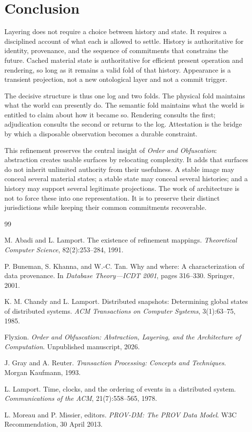 \documentclass[11pt]{article}
\begin{document}
\section{Conclusion}

Layering does not require a choice between history and state. It requires a disciplined account of what each is allowed to settle. History is authoritative for identity, provenance, and the sequence of commitments that constrains the future. Cached material state is authoritative for efficient present operation and rendering, so long as it remains a valid fold of that history. Appearance is a transient projection, not a new ontological layer and not a commit trigger.

The decisive structure is thus one log and two folds. The physical fold maintains what the world can presently do. The semantic fold maintains what the world is entitled to claim about how it became so. Rendering consults the first; adjudication consults the second or returns to the log. Attestation is the bridge by which a disposable observation becomes a durable constraint.

This refinement preserves the central insight of \emph{Order and Obfuscation}: abstraction creates usable surfaces by relocating complexity. It adds that surfaces do not inherit unlimited authority from their usefulness. A stable image may conceal several material states; a stable state may conceal several histories; and a history may support several legitimate projections. The work of architecture is not to force these into one representation. It is to preserve their distinct jurisdictions while keeping their common commitments recoverable.

\begin{thebibliography}{99}

M. Abadi and L. Lamport.
The existence of refinement mappings.
\emph{Theoretical Computer Science}, 82(2):253--284, 1991.

P. Buneman, S. Khanna, and W.-C. Tan.
Why and where: A characterization of data provenance.
In \emph{Database Theory---ICDT 2001}, pages 316--330. Springer, 2001.

K. M. Chandy and L. Lamport.
Distributed snapshots: Determining global states of distributed systems.
\emph{ACM Transactions on Computer Systems}, 3(1):63--75, 1985.

Flyxion.
\emph{Order and Obfuscation: Abstraction, Layering, and the Architecture of Computation}.
Unpublished manuscript, 2026.

J. Gray and A. Reuter.
\emph{Transaction Processing: Concepts and Techniques}.
Morgan Kaufmann, 1993.

L. Lamport.
Time, clocks, and the ordering of events in a distributed system.
\emph{Communications of the ACM}, 21(7):558--565, 1978.

L. Moreau and P. Missier, editors.
\emph{PROV-DM: The PROV Data Model}.
W3C Recommendation, 30 April 2013.

\end{thebibliography}
\end{document}

